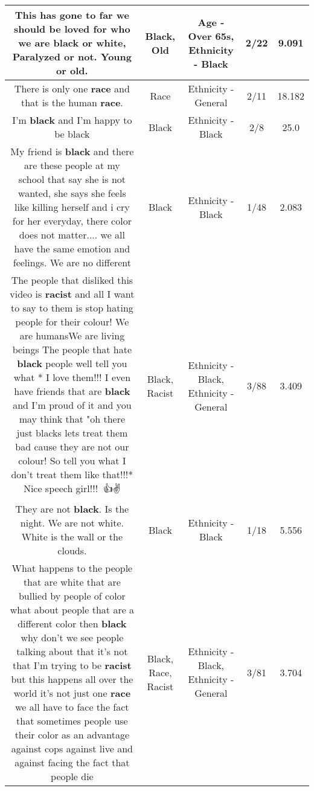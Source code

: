 \documentclass[11pt]{article}
\newlength\mylength
\begin{document}
\begin{center}
\begin{longtable}{|C{.65\mylength}|C{.30\mylength}|C{.12\mylength}|C{.12\mylength}|C{.12\mylength}|}
  \small This has gone to far we should be loved for who we are \textbf{black} or white, Paralyzed or not. Young or \textbf{old}.\normalsize   & Black, Old & Age - Over 65s, Ethnicity - Black & 2/22 & 9.091 \\  \hline
  \small There is only one \textbf{race} and that is the human \textbf{race}.\normalsize   & Race & Ethnicity - General & 2/11 & 18.182 \\  \hline
  \small I'm \textbf{black} and I'm happy to be black\normalsize   & Black & Ethnicity - Black & 2/8 & 25.0 \\  \hline
  \small My friend is \textbf{black} and there are these people at my school that say she is not wanted, she says she feels like killing herself and i cry for her everyday, there color does not matter.... we all have the same emotion and feelings. We are no different\normalsize   & Black & Ethnicity - Black & 1/48 & 2.083 \\  \hline
  \small The people that disliked this video is \textbf{racist} and all I want to say to them is stop hating people for their colour! We are humansWe are living beings The people that hate \textbf{black} people well tell you what * I love them!!! I even have friends that are \textbf{black} and I'm proud of it and you may think that "oh there just blacks lets treat them bad cause they are not our colour! So tell you what I don't treat them like that!!!* Nice speech girl!!!💖💖👍✌️\normalsize   & Black, Racist & Ethnicity - Black, Ethnicity - General & 3/88 & 3.409 \\  \hline
  \small They are not \textbf{black}. Is the night. We are not white. White is the wall or the clouds.\normalsize   & Black & Ethnicity - Black & 1/18 & 5.556 \\  \hline
  \small What happens to the people that are white that are bullied by people of color what about people that are a different color then \textbf{black} why don't we see people talking about that it's not that I'm trying to be \textbf{racist} but this happens all over the world it's not just one \textbf{race} we all have to face the fact that sometimes people use their color as an advantage against cops against live and against facing the fact that people die\normalsize   & Black, Race, Racist & Ethnicity - Black, Ethnicity - General & 3/81 & 3.704 \\  \hline

\end{longtable}
\end{center}
\end{document}
